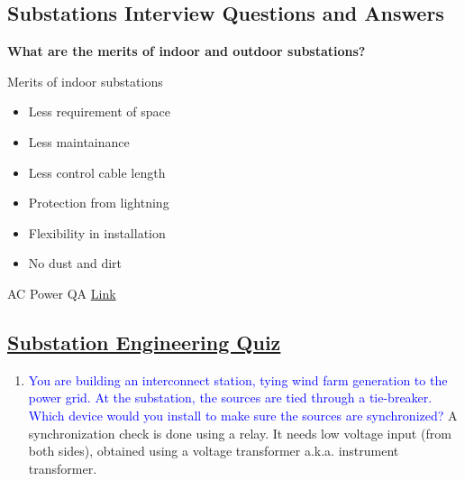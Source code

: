 \subsection{Substations Interview Questions and Answers}

\textbf{What are the merits of indoor and outdoor substations?}

Merits of indoor substations
\begin{itemize}
    \item Less requirement of space
    \item Less maintainance 
    \item Less control cable length
    \item Protection from lightning
    \item Flexibility in installation
    \item No dust and dirt
\end{itemize}

AC Power QA \href{https://www.studocu.com/en-gb/document/glasgow-caledonian-university/electrical-systems/ac-power-question-and-solution-v1-pdf/3794827}{Link}

\subsection{\href{https://peguru.com/quiz-substation-engineering/}{Substation Engineering Quiz}}
    \begin{enumerate}
        \item \textcolor{blue}{You are building an interconnect station, tying wind farm generation to the power grid. At the substation, the sources are tied through a tie-breaker. Which device would you install to make sure the sources are synchronized?} A synchronization check is done using a relay. It needs low voltage input (from both sides), obtained using a voltage transformer a.k.a. instrument transformer.
    \end{enumerate}